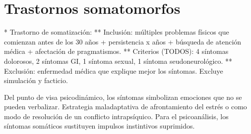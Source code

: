 \chapter{Trastornos somatomorfos}

* Trastorno de somatización:
** Inclusión: múltiples problemas físicos que comienzan antes de los 30 años + persistencia x años + búsqueda de atención médica + afectación de pragmatismos.
** Criterios (TODOS): 4 síntomas dolorosos, 2 síntomas GI, 1 síntoma sexual, 1 síntoma seudoneurológico.
** Exclusión: enfermedad médica que explique mejor los síntomas. Excluye simulación y facticio.

Del punto de visa psicodinámico, los síntomas simbolizan emociones que no se pueden verbalizar. Estrategia maladaptativa de afrontamiento del estrés o como modo de resolución de un conflicto intrapsíquico.
Para el psicoanálisis, los síntomas somáticos sustituyen impulsos instintivos suprimidos.
